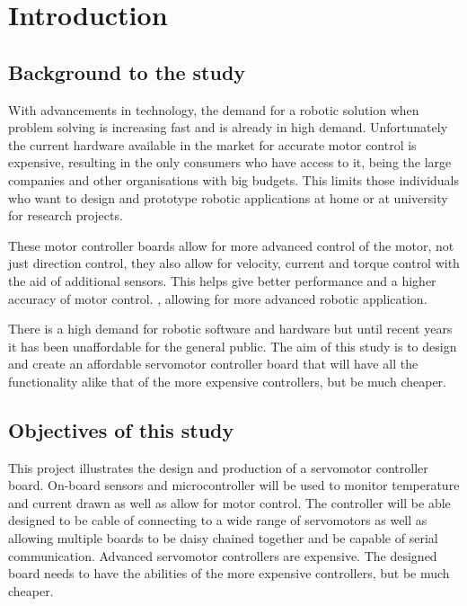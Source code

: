 \chapter{Introduction}

\vspace{10mm}
\section{Background to the study}
\vspace{5mm}
With advancements in technology, the demand for a robotic solution when problem solving is increasing fast and is already in high demand. Unfortunately the current hardware available in the market for accurate motor control is expensive, resulting in the only consumers who have access to it, being the large companies and other organisations with big budgets. This limits those individuals who want to design and prototype robotic applications at home or at university for research projects. 

These motor controller boards allow for more advanced control of the motor, not just direction control, they also allow for velocity, current and torque control with the aid of additional sensors. This helps give better performance and a higher accuracy of motor control. , allowing for more advanced robotic application.

There is a high demand for robotic software and hardware but until recent years it has been unaffordable for the general public. The aim of this study is to design and create an affordable servomotor controller board that will have all the functionality alike that of the more expensive controllers, but be much cheaper.   

\newpage
\section{Objectives of this study}
This project illustrates the design and production of a servomotor controller board. On-board sensors and microcontroller will be used to monitor temperature and current drawn as well as allow for motor control. The controller will be able designed to be cable of connecting to a wide range of servomotors as well as allowing multiple boards to be daisy chained together and be capable of serial communication. Advanced servomotor controllers are expensive. The designed board needs to have the abilities of the more expensive controllers, but be much cheaper. 

\vspace{5mm}
